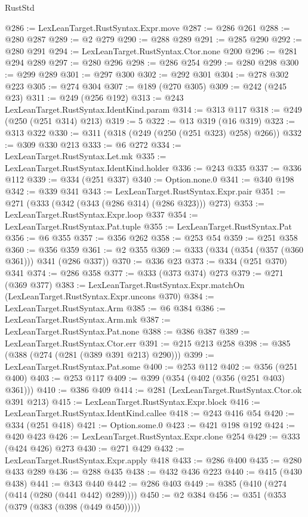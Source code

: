 \begin{lexlean}{RustStd}
\begin{coremodule}
@286 := LexLeanTarget.RustSyntax.Expr.move
@287 := @286 @261
@288 := @280 @287
@289 := @2 @279
@290 := @288 @289
@291 := @285 @290
@292 := @280 @291
@294 := LexLeanTarget.RustSyntax.Ctor.none @200
@296 := @281 @294 @289
@297 := @280 @296
@298 := @286 @254
@299 := @280 @298
@300 := @299 @289
@301 := @297 @300
@302 := @292 @301
@304 := @278 @302 @223
@305 := @274 @304
@307 := @189 (@270 @305)
@309 := @242 (@245 @23)
@311 := @249 (@256 @192)
@313 := @243 LexLeanTarget.RustSyntax.IdentKind.param
@314 := @313 @117
@318 := @249 (@250 (@251 @314) @213)
@319 := 5
@322 := @13 @319 (@16 @319)
@323 := @313 @322
@330 := @311 (@318 (@249 (@250 (@251 @323) @258) @266))
@332 := @309 @330 @213
@333 := @6 @272
@334 := LexLeanTarget.RustSyntax.Let.mk
@335 := LexLeanTarget.RustSyntax.IdentKind.holder
@336 := @243 @335
@337 := @336 @112
@339 := @334 (@251 @337)
@340 := Option.none.{0}
@341 := @340 @198
@342 := @339 @341
@343 := LexLeanTarget.RustSyntax.Expr.pair
@351 := @271 (@333 (@342 (@343 (@286 @314) (@286 @323))) @273)
@353 := LexLeanTarget.RustSyntax.Expr.loop @337
@354 := LexLeanTarget.RustSyntax.Pat.tuple
@355 := LexLeanTarget.RustSyntax.Pat
@356 := @6 @355
@357 := @356 @262
@358 := @253 @54
@359 := @251 @358
@360 := @356 @359
@361 := @2 @355
@369 := @333 (@334 (@354 (@357 (@360 @361))) @341 (@286 @337))
@370 := @336 @23
@373 := @334 (@251 @370) @341
@374 := @286 @358
@377 := @333 (@373 @374) @273
@379 := @271 (@369 @377)
@383 := LexLeanTarget.RustSyntax.Expr.matchOn (LexLeanTarget.RustSyntax.Expr.uncons @370)
@384 := LexLeanTarget.RustSyntax.Arm
@385 := @6 @384
@386 := LexLeanTarget.RustSyntax.Arm.mk
@387 := LexLeanTarget.RustSyntax.Pat.none
@388 := @386 @387
@389 := LexLeanTarget.RustSyntax.Ctor.err
@391 := @215 @213 @258
@398 := @385 (@388 (@274 (@281 (@389 @391 @213) @290)))
@399 := LexLeanTarget.RustSyntax.Pat.some
@400 := @253 @112
@402 := @356 (@251 @400)
@403 := @253 @117
@409 := @399 (@354 (@402 (@356 (@251 @403) @361)))
@410 := @386 @409
@414 := @281 (LexLeanTarget.RustSyntax.Ctor.ok @391 @213)
@415 := LexLeanTarget.RustSyntax.Expr.block
@416 := LexLeanTarget.RustSyntax.IdentKind.callee
@418 := @243 @416 @54
@420 := @334 (@251 @418)
@421 := Option.some.{0}
@423 := @421 @198 @192
@424 := @420 @423
@426 := LexLeanTarget.RustSyntax.Expr.clone @254
@429 := @333 (@424 @426) @273
@430 := @271 @429
@432 := LexLeanTarget.RustSyntax.Expr.apply @418
@433 := @286 @400
@435 := @280 @433 @289
@436 := @288 @435
@438 := @432 @436 @223
@440 := @415 (@430 @438)
@441 := @343 @440
@442 := @286 @403
@449 := @385 (@410 (@274 (@414 (@280 (@441 @442) @289))))
@450 := @2 @384
@456 := @351 (@353 (@379 (@383 (@398 (@449 @450)))))

\end{coremodule}
\end{lexlean}
